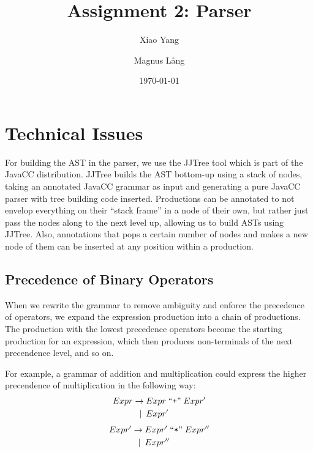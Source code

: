 \documentclass[a4paper,11pt]{article}
\title{Assignment 2: Parser}
\author{Xiao Yang \and Magnus L{\aa}ng} %
\date{\today}
\begin{document}
\maketitle

\section{Technical Issues}
For building the AST in the parser, we use the JJTree tool which is part of the JavaCC distribution.
JJTree builds the AST bottom-up using a stack of nodes, taking an annotated JavaCC grammar as input and generating a pure JavaCC parser with tree building code inserted.
Productions can be annotated to not envelop everything on their ``stack frame'' in a node of their own, but rather just pass the nodes along to the next level up, allowing us to build ASTs using JJTree.
Also, annotations that pops a certain number of nodes and makes a new node of them can be inserted at any position within a production.

\subsection{Precedence of Binary Operators}
When we rewrite the grammar to remove ambiguity and enforce the precedence of operators, we expand the expression production into a chain of productions.
The production with the lowest precedence operators become the starting production for an expression, which then produces non-terminals of the next precendence level, and so on.

For example, a grammar of addition and multiplication could express the higher precendence of multiplication in the following way:
\begin{align*}
  Expr \rightarrow &\; Expr \;\text{``\texttt{+}''}\; Expr' \\
       \mid \:     &\; Expr'
\end{align*}
\begin{align*}
  Expr' \rightarrow &\; Expr' \;\text{``\texttt{*}''}\; Expr'' \\
        \mid \:     &\; Expr''
\end{align*}
\end{document}
